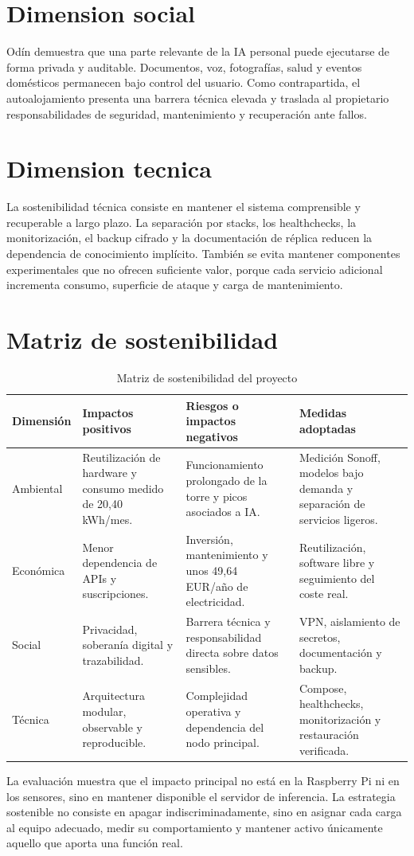 \section{Dimension social}
Odín demuestra que una parte relevante de la IA personal puede ejecutarse de forma privada y auditable. Documentos, voz, fotografías, salud y eventos domésticos permanecen bajo control del usuario. Como contrapartida, el autoalojamiento presenta una barrera técnica elevada y traslada al propietario responsabilidades de seguridad, mantenimiento y recuperación ante fallos.

\section{Dimension tecnica}
La sostenibilidad técnica consiste en mantener el sistema comprensible y recuperable a largo plazo. La separación por stacks, los healthchecks, la monitorización, el backup cifrado y la documentación de réplica reducen la dependencia de conocimiento implícito. También se evita mantener componentes experimentales que no ofrecen suficiente valor, porque cada servicio adicional incrementa consumo, superficie de ataque y carga de mantenimiento.

\section{Matriz de sostenibilidad}
\begin{table}[H]
  \centering
  \caption{Matriz de sostenibilidad del proyecto}
  \label{tab:sostenibilidad}
  \small
  \begin{tabularx}{\textwidth}{p{}XXX}
    \toprule
    Dimensión & Impactos positivos & Riesgos o impactos negativos & Medidas adoptadas \\
    \midrule
    Ambiental & Reutilización de hardware y consumo medido de 20,40 kWh/mes. & Funcionamiento prolongado de la torre y picos asociados a IA. & Medición Sonoff, modelos bajo demanda y separación de servicios ligeros. \\
    Económica & Menor dependencia de APIs y suscripciones. & Inversión, mantenimiento y unos 49,64 EUR/año de electricidad. & Reutilización, software libre y seguimiento del coste real. \\
    Social & Privacidad, soberanía digital y trazabilidad. & Barrera técnica y responsabilidad directa sobre datos sensibles. & VPN, aislamiento de secretos, documentación y backup. \\
    Técnica & Arquitectura modular, observable y reproducible. & Complejidad operativa y dependencia del nodo principal. & Compose, healthchecks, monitorización y restauración verificada. \\
    \bottomrule
  \end{tabularx}
\end{table}

La evaluación muestra que el impacto principal no está en la Raspberry Pi ni en los sensores, sino en mantener disponible el servidor de inferencia. La estrategia sostenible no consiste en apagar indiscriminadamente, sino en asignar cada carga al equipo adecuado, medir su comportamiento y mantener activo únicamente aquello que aporta una función real.
